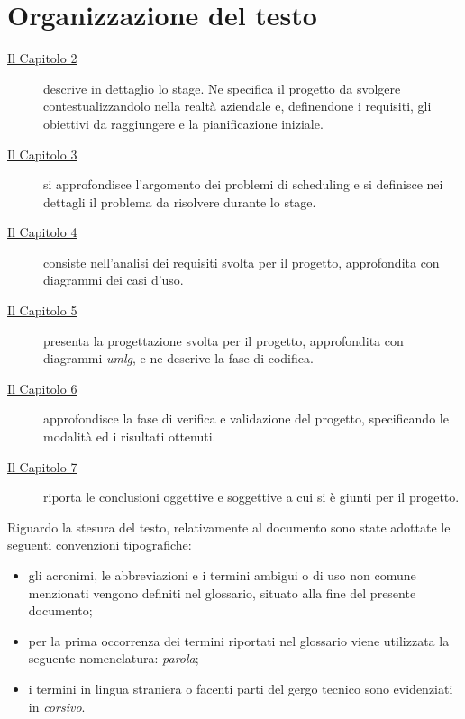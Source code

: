 \section{Organizzazione del testo}

\begin{description}
    \item[{\hyperref[cap:descrizione-stage]{Il Capitolo 2}}] descrive in dettaglio lo stage. Ne specifica il progetto da svolgere contestualizzandolo nella realtà aziendale e, definendone i requisiti, gli obiettivi da raggiungere e la pianificazione iniziale.
    
    \item[{\hyperref[cap:definizione-problema]{Il Capitolo 3}}] si approfondisce l'argomento dei problemi di scheduling e si definisce nei dettagli il problema da risolvere durante lo stage.
    
    \item[{\hyperref[cap:analisi-requisiti]{Il Capitolo 4}}] consiste nell'analisi dei requisiti svolta per il progetto, approfondita con diagrammi dei casi d'uso.
    
    \item[{\hyperref[cap:progettazione-codifica]{Il Capitolo 5}}] presenta la progettazione svolta per il progetto, approfondita con diagrammi \emph{\gls{umlg}}\glsfirstoccur, e ne descrive la fase di codifica.
    
    \item[{\hyperref[cap:verifica-validazione]{Il Capitolo 6}}] approfondisce la fase di verifica e validazione del progetto, specificando le modalità ed i risultati ottenuti.
    
    \item[{\hyperref[cap:conclusioni]{Il Capitolo 7}}]
    riporta le conclusioni oggettive e soggettive a cui si è giunti per il progetto.
\end{description}

\noindent
Riguardo la stesura del testo, relativamente al documento sono state adottate le seguenti convenzioni tipografiche:
\begin{itemize}
	\item gli acronimi, le abbreviazioni e i termini ambigui o di uso non comune menzionati vengono definiti nel glossario, situato alla fine del presente documento;
	\item per la prima occorrenza dei termini riportati nel glossario viene utilizzata la seguente nomenclatura: \emph{parola}\glsfirstoccur;
	\item i termini in lingua straniera o facenti parti del gergo tecnico sono evidenziati in \emph{corsivo}.
\end{itemize}